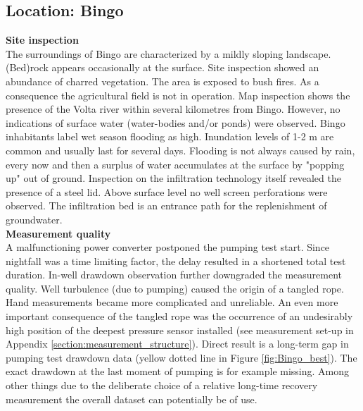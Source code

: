 \subsection{Location: Bingo}

\textbf{Site inspection}\\
The surroundings of Bingo are characterized by a mildly sloping landscape. (Bed)rock appears occasionally at the surface. Site inspection showed an abundance of charred vegetation. The area is exposed to bush fires. As a consequence the agricultural field is not in operation. Map inspection shows the presence of the Volta river within several kilometres from Bingo. However, no indications of surface water (water-bodies and/or ponds) were observed. Bingo inhabitants label wet season flooding as high. Inundation levels of 1-2 m are common and usually last for several days. Flooding is not always caused by rain, every now and then a surplus of water accumulates at the surface by "popping up" out of ground. Inspection on the infiltration technology itself revealed the presence of a steel lid. Above surface level no well screen perforations were observed. The infiltration bed is an entrance path for the replenishment of groundwater.\\

\textbf{Measurement quality}\\
A malfunctioning power converter postponed the pumping test start. Since nightfall was a time limiting factor, the delay resulted in a shortened total test duration. In-well drawdown observation further downgraded the measurement quality. Well turbulence (due to pumping) caused the origin of a tangled rope. Hand measurements became more complicated and unreliable. An even more important consequence of the tangled rope was the occurrence of an undesirably high position of the deepest pressure sensor installed (see measurement set-up in Appendix \ref{section:measurement_structure}). Direct result is a long-term gap in pumping test drawdown data (yellow dotted line in Figure \ref{fig:Bingo_best}). The exact drawdown at the last moment of pumping is for example missing. Among other things due to the deliberate choice of a relative long-time recovery measurement the overall dataset can potentially be of use. \\

